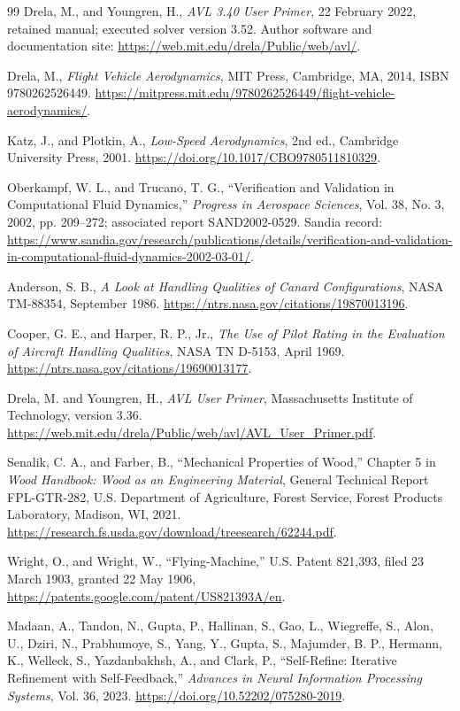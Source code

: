 \documentclass[11pt,a4paper]{article}
\begin{document}
\begin{thebibliography}{99}
 Drela, M., and Youngren, H., \emph{AVL 3.40 User Primer}, 22 February 2022, retained manual; executed solver version 3.52. Author software and documentation site: \url{https://web.mit.edu/drela/Public/web/avl/}.

 Drela, M., \emph{Flight Vehicle Aerodynamics}, MIT Press, Cambridge, MA, 2014, ISBN 9780262526449. \url{https://mitpress.mit.edu/9780262526449/flight-vehicle-aerodynamics/}.

 Katz, J., and Plotkin, A., \emph{Low-Speed Aerodynamics}, 2nd ed., Cambridge University Press, 2001. \url{https://doi.org/10.1017/CBO9780511810329}.

 Oberkampf, W. L., and Trucano, T. G., ``Verification and Validation in Computational Fluid Dynamics,'' \emph{Progress in Aerospace Sciences}, Vol. 38, No. 3, 2002, pp. 209--272; associated report SAND2002-0529. Sandia record: \url{https://www.sandia.gov/research/publications/details/verification-and-validation-in-computational-fluid-dynamics-2002-03-01/}.

 Anderson, S. B., \emph{A Look at Handling Qualities of Canard Configurations}, NASA TM-88354, September 1986. \url{https://ntrs.nasa.gov/citations/19870013196}.

 Cooper, G. E., and Harper, R. P., Jr., \emph{The Use of Pilot Rating in the Evaluation of Aircraft Handling Qualities}, NASA TN D-5153, April 1969. \url{https://ntrs.nasa.gov/citations/19690013177}.

 Drela, M. and Youngren, H., \emph{AVL User Primer}, Massachusetts Institute of Technology, version 3.36. \url{https://web.mit.edu/drela/Public/web/avl/AVL_User_Primer.pdf}.

 Senalik, C. A., and Farber, B., ``Mechanical Properties of Wood,'' Chapter 5 in \emph{Wood Handbook: Wood as an Engineering Material}, General Technical Report FPL-GTR-282, U.S. Department of Agriculture, Forest Service, Forest Products Laboratory, Madison, WI, 2021. \url{https://research.fs.usda.gov/download/treesearch/62244.pdf}.

 Wright, O., and Wright, W., ``Flying-Machine,'' U.S. Patent 821,393, filed 23 March 1903, granted 22 May 1906, \url{https://patents.google.com/patent/US821393A/en}.

 Madaan, A., Tandon, N., Gupta, P., Hallinan, S., Gao, L., Wiegreffe, S., Alon, U., Dziri, N., Prabhumoye, S., Yang, Y., Gupta, S., Majumder, B. P., Hermann, K., Welleck, S., Yazdanbakhsh, A., and Clark, P., ``Self-Refine: Iterative Refinement with Self-Feedback,'' \emph{Advances in Neural Information Processing Systems}, Vol. 36, 2023. \url{https://doi.org/10.52202/075280-2019}.


\end{thebibliography}
\end{document}
